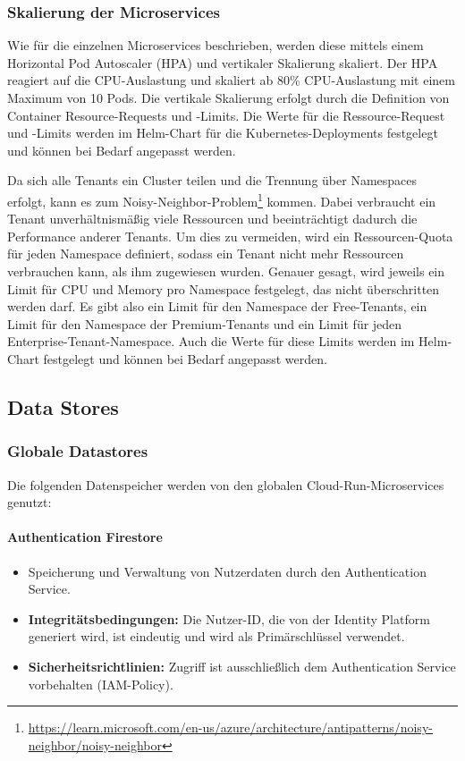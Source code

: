 \subsubsection{Skalierung der Microservices}

Wie für die einzelnen Microservices beschrieben, werden diese mittels einem Horizontal Pod Autoscaler (HPA) und vertikaler Skalierung skaliert. 
Der HPA reagiert auf die CPU-Auslastung und skaliert ab 80\% CPU-Auslastung mit einem Maximum von 10 Pods. 
Die vertikale Skalierung erfolgt durch die Definition von Container Resource-Requests und -Limits. 
Die Werte für die Ressource-Request und -Limits werden im Helm-Chart für die Kubernetes-Deployments festgelegt und können bei Bedarf angepasst werden.

Da sich alle Tenants ein Cluster teilen und die Trennung über Namespaces erfolgt, kann es zum Noisy-Neighbor-Problem\footnote{\url{https://learn.microsoft.com/en-us/azure/architecture/antipatterns/noisy-neighbor/noisy-neighbor}} kommen.
Dabei verbraucht ein Tenant unverhältnismäßig viele Ressourcen und beeinträchtigt dadurch die Performance anderer Tenants.
Um dies zu vermeiden, wird ein Ressourcen-Quota für jeden Namespace definiert, sodass ein Tenant nicht mehr Ressourcen verbrauchen kann, als ihm zugewiesen wurden.
Genauer gesagt, wird jeweils ein Limit für CPU und Memory pro Namespace festgelegt, das nicht überschritten werden darf.
Es gibt also ein Limit für den Namespace der Free-Tenants, ein Limit für den Namespace der Premium-Tenants und ein Limit für 
jeden Enterprise-Tenant-Namespace. Auch die Werte für diese Limits werden im Helm-Chart festgelegt und können bei Bedarf angepasst werden.

\subsection{Data Stores}

\subsubsection{Globale Datastores}
Die folgenden Datenspeicher werden von den globalen Cloud-Run-Microservices genutzt:

\paragraph{Authentication Firestore}
\begin{itemize}
	\item Speicherung und Verwaltung von Nutzerdaten durch den Authentication Service.
	\item \textbf{Integritätsbedingungen:} Die Nutzer-ID, die von der Identity Platform generiert wird, ist eindeutig und wird als Primärschlüssel verwendet.
	\item \textbf{Sicherheitsrichtlinien:} Zugriff ist ausschließlich dem Authentication Service vorbehalten (IAM-Policy).
\end{itemize}

